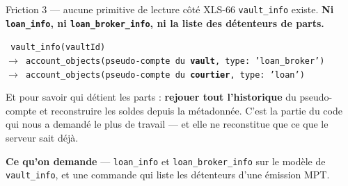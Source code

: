 \documentclass[aspectratio=169,11pt]{beamer}
\newcommand{\tc}[1]{{\small\texttt{#1}}}
\begin{document}
\begin{frame}{Friction 3 --- aucune primitive de lecture côté XLS-66}
\vspace{6pt}
\tc{vault\_info} existe. \textbf{Ni \tc{loan\_info}, ni \tc{loan\_broker\_info}, ni la liste
des détenteurs de parts.}
\vspace{6pt}

\colorbox{shade}{\parbox{\textwidth}{\vspace{3pt}\small\texttt{
vault\_info(vaultId)\\
\phantom{xx}$\rightarrow$ account\_objects(pseudo-compte du \textbf{vault}, type: 'loan\_broker')\\
\phantom{xxxx}$\rightarrow$ account\_objects(pseudo-compte du \textbf{courtier}, type: 'loan')}\vspace{3pt}}}
\vspace{8pt}

Et pour savoir qui détient les parts : \textbf{rejouer tout l'historique} du pseudo-compte
et reconstruire les soldes depuis la métadonnée. C'est la partie du code qui nous a demandé
le plus de travail --- et elle ne reconstitue que ce que le serveur sait déjà.
\vspace{8pt}

{\color{accent}\textbf{Ce qu'on demande}} --- \tc{loan\_info} et \tc{loan\_broker\_info} sur le
modèle de \tc{vault\_info}, et une commande qui liste les détenteurs d'une émission MPT.
\end{frame}
\end{document}
